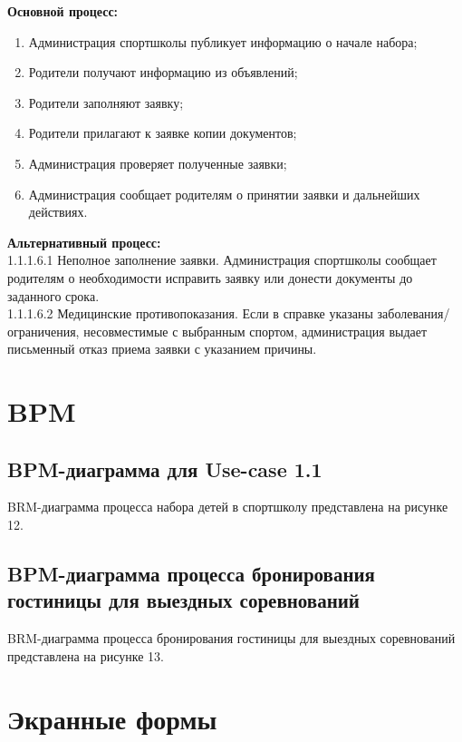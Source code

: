 \documentclass[12pt,a4paper,final]{article} %
\begin{document}
\par \textbf{Основной процесс:}
\begin{enumerate}[nosep, label=1.1.1.\arabic*]
	\item Администрация спортшколы публикует информацию о начале набора;
	\item Родители получают информацию из объявлений;
	\item Родители заполняют заявку;
	\item Родители прилагают к заявке копии документов;
	\item Администрация проверяет полученные заявки;
	\item Администрация сообщает родителям о принятии заявки и дальнейших действиях. 
\end{enumerate}

\par \textbf{Альтернативный процесс:} \\
1.1.1.6.1 Неполное заполнение заявки. Администрация спортшколы сообщает родителям о необходимости исправить заявку или донести документы до заданного срока. \\
1.1.1.6.2 Медицинские противопоказания. Если в справке указаны заболевания/ограничения, несовместимые с выбранным спортом, администрация выдает письменный отказ приема заявки с указанием причины.

\newpage
\section{BPM}
\subsection{BPM-диаграмма для Use-case 1.1}
\par BRM-диаграмма процесса набора детей в спортшколу представлена на рисунке 12.

\subsection{BPM-диаграмма процесса бронирования гостиницы для выездных соревнований}
\par BRM-диаграмма процесса бронирования гостиницы для выездных соревнований представлена на рисунке 13.

\newpage
 

\newpage
 
\setcounter{figure}{13}

\clearpage
\section{Экранные формы}
\end{document}

